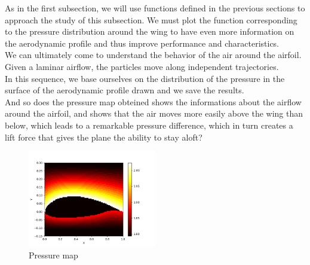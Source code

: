 As in the first subsection, we will use functions defined in the previous sections to approach the study of this subsection.
We must plot the function corresponding to the pressure distribution around the wing to have even more information on the aerodynamic profile and thus improve performance and characteristics.\\
We can ultimately come to understand the behavior of the air around the airfoil.\\
Given a laminar airflow, the particles move along independent trajectories.\\
In this sequence, we base ourselves on the distribution of the pressure in the surface of the aerodynamic profile drawn and we save the results.\\
And so does the pressure map obteined shows the informations about the airflow around the airfoil, and shows that the air moves more easily above the wing than below, which leads to a remarkable pressure difference, which in turn creates a lift force that gives the plane the ability to stay aloft?\\
\begin{figure}[H]
  \centering
  \includegraphics[width=0.5\textwidth]{img/pressure_map.png}
  \caption{Pressure map}
  \label{fig:pressure}
\end{figure}
